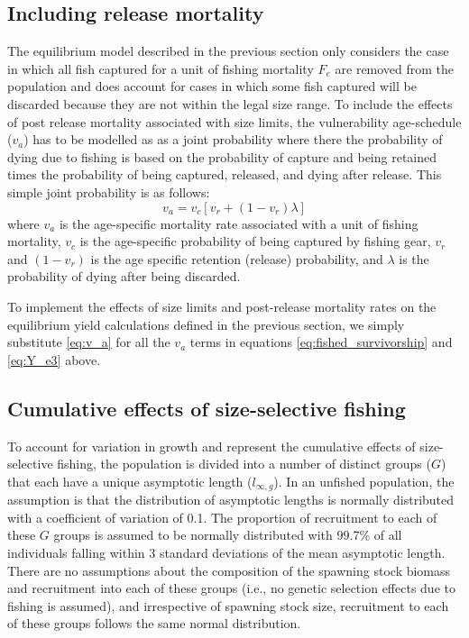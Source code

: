 \subsection*{Including release mortality} %
\label{sub:including_release_mortality}
The equilibrium model described in the previous section only considers the case in which all fish captured for a unit of fishing mortality $F_e$ are removed from the population and does account for cases in which some fish captured will be discarded because they are not within the legal size range.  To include the effects of post release mortality associated with size limits, the vulnerability age-schedule ($v_a$) has to be modelled as as a joint probability where there the probability of dying due to fishing is based on the probability of capture and being retained times the probability of being captured, released, and dying after release.  This simple joint probability is as follows:
\begin{equation} \label{eq:v_a}
	v_a = v_c[v_r + (1-v_r)\lambda]
\end{equation}
where $v_a$ is the age-specific mortality rate associated with a unit of fishing mortality, $v_c$ is the age-specific probability of being captured by fishing gear, $v_r$ and $(1-v_r)$ is the age specific retention (release) probability, and $\lambda$ is the probability of dying after being discarded.

To implement the effects of size limits and post-release mortality rates on the equilibrium yield calculations defined in the previous section, we simply substitute \eqref{eq:v_a} for all the $v_a$ terms in equations \ref{eq:fished_survivorship} and \ref{eq:Y_e3} above.

\subsection*{Cumulative effects of size-selective fishing} %
\label{sub:cumulative_effects_of_size_selective_fishing}
To account for variation in growth and represent the cumulative effects of size-selective fishing, the population is divided into a number of distinct groups ($G$) that each have a unique asymptotic length ($l_{\infty,g}$).  In an unfished population, the assumption is that the distribution of asymptotic lengths is normally distributed with a coefficient of variation of 0.1.  The proportion of recruitment to each of these $G$ groups is assumed to be normally distributed with 99.7\% of all individuals falling within 3 standard deviations of the mean asymptotic length.  There are no assumptions about the composition of the spawning stock biomass and recruitment into each of these groups (i.e., no genetic selection effects due to fishing is assumed), and irrespective of spawning stock size, recruitment to each of these groups follows the same normal distribution.

